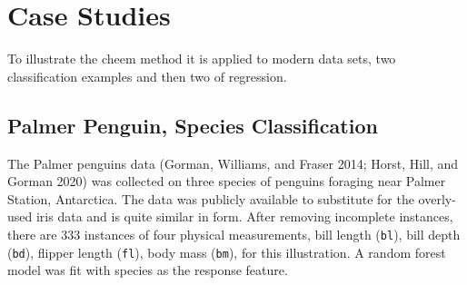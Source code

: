 \documentclass[11pt,twoside]{article}
\begin{document}
\hypertarget{sec:casestudies}{%
\section{Case Studies}\label{sec:casestudies}}

To illustrate the cheem method it is applied to modern data sets, two classification examples and then two of regression.

\hypertarget{palmer-penguin-species-classification}{%
\subsection{Palmer Penguin, Species Classification}\label{palmer-penguin-species-classification}}

The Palmer penguins data (Gorman, Williams, and Fraser 2014; Horst, Hill, and Gorman 2020) was collected on three species of penguins foraging near Palmer Station, Antarctica. The data was publicly available to substitute for the overly-used iris data and is quite similar in form. After removing incomplete instances, there are 333 instances of four physical measurements, bill length (\texttt{bl}), bill depth (\texttt{bd}), flipper length (\texttt{fl}), body mass (\texttt{bm}), for this illustration. A random forest model was fit with species as the response feature.
\end{document}

